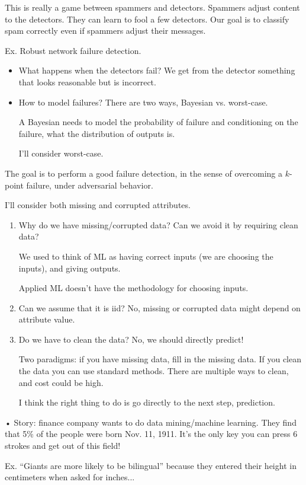 This is really a game between spammers and detectors.  Spammers adjust content to the detectors. They can learn to fool a few detectors. Our goal is to classify spam correctly even if spammers adjust their messages.

Ex. Robust network failure detection. 
\begin{itemize}
\item
What happens when the detectors fail? We get from the detector something that looks reasonable but is incorrect. 
\item
How to model failures? There are two ways, Bayesian vs. worst-case.

A Bayesian needs to model the probability of failure and  conditioning on the failure, what the distribution of outputs is.

I'll consider worst-case.
\end{itemize}
The goal is to perform a good failure detection, in the sense of overcoming a $k$-point failure, under adversarial behavior.

I'll consider both missing and corrupted attributes.
\begin{enumerate}
\item
Why do we have missing/corrupted data? 
Can we avoid it by requiring clean data?

We used to think of ML as having correct inputs (we are choosing the inputs), and giving outputs. 

Applied ML doesn't have the methodology for choosing inputs. 
\item
Can we assume that it is iid? No, missing or corrupted data might depend on attribute value.

\item
Do we have to clean the data? No, we should directly predict!

Two paradigms: if you have missing data, fill in the missing data. If you clean the data you can use standard methods. There are multiple ways to clean, and cost could be high.

I think the right thing to do is go directly to the next step, prediction.
\end{enumerate}•
Story: finance company wants to do data mining/machine learning. They find that 5\% of the people were born Nov. 11, 1911. It's the only key you can press 6 strokes and get out of this field!

Ex. ``Giants are more likely to be bilingual'' because they entered their height in centimeters when asked for inches...

